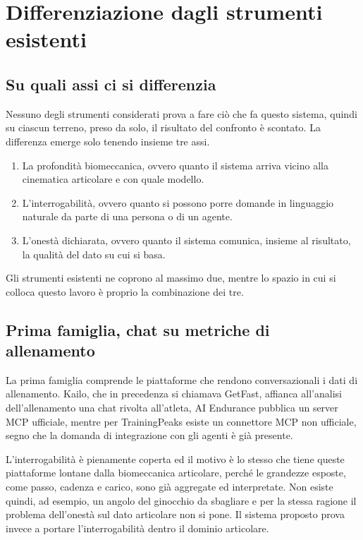 \chapter{Differenziazione dagli strumenti esistenti}
\label{chap:comparazione}

\section{Su quali assi ci si differenzia}
\label{sec:ch5:assi}

Nessuno degli strumenti considerati prova a fare ciò che fa questo sistema, quindi
su ciascun terreno, preso da solo, il risultato del confronto è scontato. La
differenza emerge solo tenendo insieme tre assi.

\begin{enumerate}[label=\textbf{A\arabic*.},leftmargin=*]
  \item La profondità biomeccanica, ovvero quanto il sistema arriva vicino alla
    cinematica articolare e con quale modello.
  \item L'interrogabilità, ovvero quanto si possono porre domande in linguaggio
    naturale da parte di una persona o di un agente.
  \item L'onestà dichiarata, ovvero quanto il sistema comunica, insieme al
    risultato, la qualità del dato su cui si basa.
\end{enumerate}

Gli strumenti esistenti ne coprono al massimo due, mentre lo spazio in cui si
colloca questo lavoro è proprio la combinazione dei tre.

\section{Prima famiglia, chat su metriche di allenamento}
\label{sec:ch5:allenamento}

La prima famiglia comprende le piattaforme che rendono conversazionali i dati di
allenamento. Kailo\cite{kailo}, che in precedenza si chiamava GetFast, affianca all'analisi
dell'allenamento una chat rivolta all'atleta, AI Endurance\cite{aiendurance} pubblica
un server MCP ufficiale, mentre per TrainingPeaks\cite{trainingpeaksmcp} esiste un
connettore MCP non ufficiale, segno che la domanda di
integrazione con gli agenti è già presente.

L'interrogabilità è pienamente coperta ed il motivo è lo stesso che tiene queste
piattaforme lontane dalla biomeccanica articolare, perché le grandezze esposte,
come passo, cadenza e carico, sono già aggregate ed interpretate. Non esiste
quindi, ad esempio, un angolo del ginocchio da sbagliare e per la stessa ragione il problema
dell'onestà sul dato articolare non si pone. Il sistema proposto prova invece a
portare l'interrogabilità dentro il dominio articolare.

